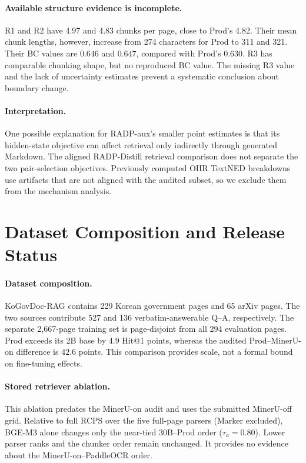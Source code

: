 \documentclass[11pt]{article}
\newcommand{\rcps}{\textnormal{\textsc{RCPS}}}
\begin{document}
\paragraph{Available structure evidence is incomplete.} R1 and R2 have 4.97 and 4.83 chunks per page, close to Prod's 4.82. Their mean chunk lengths, however, increase from 274 characters for Prod to 311 and 321. Their BC values are $0.646$ and $0.647$, compared with Prod's $0.630$. R3 has comparable chunking shape, but no reproduced BC value. The missing R3 value and the lack of uncertainty estimates prevent a systematic conclusion about boundary change.

\paragraph{Interpretation.} One possible explanation for RADP-aux's smaller point estimates is that its hidden-state objective can affect retrieval only indirectly through generated Markdown. The aligned RADP-Distill retrieval comparison does not separate the two pair-selection objectives. Previously computed OHR TextNED breakdowns use artifacts that are not aligned with the audited subset, so we exclude them from the mechanism analysis.

\section{Dataset Composition and Release Status}
\label{app:repro}

\paragraph{Dataset composition.} KoGovDoc-RAG contains 229 Korean government pages and 65 arXiv pages. The two sources contribute 527 and 136 verbatim-answerable Q--A, respectively. The separate 2{,}667-page training set is page-disjoint from all 294 evaluation pages. Prod exceeds its 2B base by $4.9$ Hit@1 points, whereas the audited Prod--MinerU-on difference is $42.6$ points. This comparison provides scale, not a formal bound on fine-tuning effects.

\paragraph{Stored retriever ablation.} This ablation predates the MinerU-on audit and uses the submitted MinerU-off grid. Relative to full \rcps{} over the five full-page parsers (Marker excluded), BGE-M3 alone changes only the near-tied 30B--Prod order ($\tau_a=0.80$). Lower parser ranks and the chunker order remain unchanged. It provides no evidence about the MinerU-on--PaddleOCR order.
\end{document}

